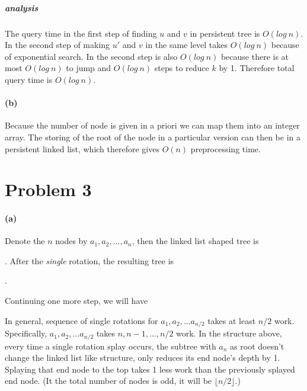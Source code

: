 \documentclass[10pt,letter]{article}
\begin{document}
\subparagraph{analysis}
The query time in the first step of finding $u$ and $v$ in persistent tree is $O(log\:n)$. In the second step of making $u'$ and $v$ in the same level takes $O(log\:n)$ because of exponential search. In the second step is also $O(log\: n)$ because there is at most $O(log\: n)$ to jump and $O(log\: n)$ steps to reduce $k$ by 1. Therefore total query time is $O(log\:n)$.

\paragraph{(b)} Because the number of node is given in a priori we can map them into an integer array. The storing of the root of the node in a particular version can then be in a persistent linked list, which therefore gives $O(n)$ preprocessing time.

\pagebreak

\section*{Problem 3}
\paragraph{(a)} 
Denote the $n$ nodes by $a_1, a_2, ..., a_n$, then the linked list shaped tree is

.
After the \emph{single} rotation, the resulting tree is .

Continuing one more step, we will have 

In general, sequence of single rotations for $a_1, a_2, ... a_{n/2}$ takes at least $n/2$ work. Specifically, $a_1, a_2, ... a_{n/2}$ takes $n, n-1, ..., n/2$ work. In the structure above, every time a single rotation splay occurs, the subtree with $a_n$ as root doesn't change the linked list like structure, only reduces its end node's depth by 1. Splaying that end node to the top takes 1 less work than the previously splayed end node. (It the total number of nodes is odd, it will be $\lfloor n/2\rfloor$.)
\end{document}
